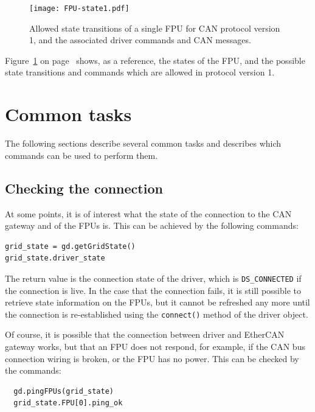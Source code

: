 \documentclass[11pt,a4paper]{scrartcl}
\begin{document}
\begin{figure}
  \texttt{[image: FPU-state1.pdf]}
  \caption{Allowed state transitions of a single FPU for CAN protocol
    version 1, and the associated driver commands and CAN messages.}
  \label{fig:states}
\end{figure}


Figure~\ref{fig:states} on page~\pageref{fig:states} shows, as a
reference, the states of the FPU, and the possible state transitions
and commands which are allowed in protocol version 1.




\section{Common tasks}

The following sections describe several common tasks
and describes which commands can be used to perform them.


\subsection{Checking the connection}
At some points, it is of interest what the state of
the connection to the CAN gateway and of the FPUs is.
This can be achieved by the following commands:
\begin{verbatim}
grid_state = gd.getGridState()
grid_state.driver_state  
\end{verbatim}

The return value is the connection state of the driver, which is
\texttt{DS\_CONNECTED} if the connection is live.  In the case that the
connection fails, it is still possible to retrieve state information
on the FPUs, but it cannot be refreshed any more until the connection
is re-established using the \texttt{connect()} method of the driver
object.

 Of course, it is possible that the
connection between driver and EtherCAN gateway works, but that an FPU
does not respond, for example, if the CAN bus connection wiring is
broken, or the FPU has no power. This can be checked by the commands:

\begin{verbatim}
  gd.pingFPUs(grid_state)
  grid_state.FPU[0].ping_ok
\end{verbatim}
\end{document}
